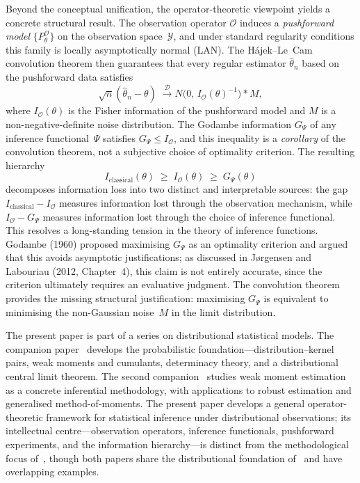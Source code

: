 \documentclass[11pt,a4paper]{article}
\begin{document}
Beyond the conceptual unification, the operator-theoretic viewpoint
yields a concrete structural result.  The observation operator
$\mathcal O$ induces a \emph{pushforward model}
$\{P_\theta^{\mathcal O}\}$ on the observation space~$\mathcal Y$, and
under standard regularity conditions this family is locally
asymptotically normal (LAN).  The H\'ajek--Le~Cam convolution theorem then
guarantees that every regular estimator $\hat\theta_n$ based on the
pushforward data satisfies
\[
\sqrt{n}(\hat\theta_n - \theta)
\;\xrightarrow{\;\mathcal D\;}
N\bigl(0,\, I_{\mathcal O}(\theta)^{-1}\bigr) * M,
\]
where $I_{\mathcal O}(\theta)$ is the Fisher information of the pushforward
model and $M$ is a non-negative-definite noise distribution.  The Godambe
information $G_\Psi$ of any inference functional~$\Psi$ satisfies
$G_\Psi \leq I_{\mathcal O}$, and this inequality is a \emph{corollary}
of the convolution theorem, not a subjective choice of optimality
criterion.  The resulting hierarchy
\begin{equation}\label{eq:info-hierarchy-intro}
I_{\mathrm{classical}}(\theta)
\;\geq\; I_{\mathcal O}(\theta)
\;\geq\; G_\Psi(\theta)
\end{equation}
decomposes information loss into two distinct and interpretable sources:
the gap $I_{\mathrm{classical}} - I_{\mathcal O}$ measures information lost
through the observation mechanism, while $I_{\mathcal O} - G_\Psi$
measures information lost through the choice of inference functional.
This resolves a long-standing tension in the theory of inference
functions.  Godambe (1960) proposed maximising $G_\Psi$ as an optimality
criterion and argued that this avoids asymptotic justifications; as
discussed in J{\o}rgensen and Labouriau (2012, Chapter~4), this claim is
not entirely accurate, since the criterion ultimately requires an
evaluative judgment.  The convolution theorem provides the missing
structural justification: maximising $G_\Psi$ is equivalent to minimising
the non-Gaussian noise~$M$ in the limit distribution.

The present paper is part of a series on distributional statistical
models.  The companion paper~\cite{LabouriauA1} develops the
probabilistic foundation---distribution--kernel pairs, weak moments and
cumulants, determinacy theory, and a distributional central limit
theorem.  The second companion~\cite{LabouriauA2} studies weak moment
estimation as a concrete inferential methodology, with applications to
robust estimation and generalised method-of-moments.  The present paper
develops a general operator-theoretic framework for statistical inference
under distributional observations; its intellectual
centre---observation operators, inference functionals, pushforward
experiments, and the information hierarchy---is distinct from the
methodological focus of~\cite{LabouriauA2}, though both papers share the
distributional foundation of~\cite{LabouriauA1} and have overlapping
examples.
\end{document}
